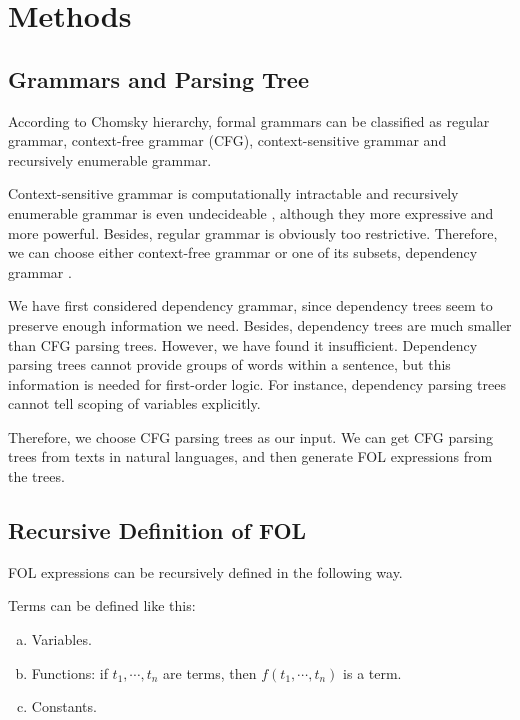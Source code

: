 \documentclass{article}
\begin{document}
\section{Methods}{
	\subsection{Grammars and Parsing Tree}{
		According to Chomsky hierarchy, formal grammars can be classified as regular grammar, context-free grammar (CFG), context-sensitive grammar and recursively enumerable grammar. 

		Context-sensitive grammar is computationally intractable \cite{lita} and recursively enumerable grammar is even undecideable \cite{merkle}, although they more expressive and more powerful. Besides, regular grammar is obviously too restrictive. Therefore, we can choose either context-free grammar or one of its subsets, dependency grammar \cite{han}. 

		We have first considered dependency grammar, since dependency trees seem to preserve enough information we need. Besides, dependency trees are much smaller than CFG parsing trees. However, we have found it insufficient. Dependency parsing trees cannot provide groups of words within a sentence, but this information is needed for first-order logic. For instance, dependency parsing trees cannot tell scoping of variables explicitly. 

		Therefore, we choose CFG parsing trees as our input. We can get CFG parsing trees from texts in natural languages, and then generate FOL expressions from the trees. 
	}

	\subsection{Recursive Definition of FOL}{
		FOL expressions can be recursively defined in the following way. \cite{andrews}

		Terms can be defined like this: 

		\begin{enumerate}[(a)]
		\item {
			Variables. 
		}

		\item {
			Functions: if $t_1, \cdots, t_n $ are terms, then $f(t_1, \cdots, t_n)$ is a term. 
		}

		\item {
			Constants. 
		}
		\end{enumerate}

}}
\end{document}

